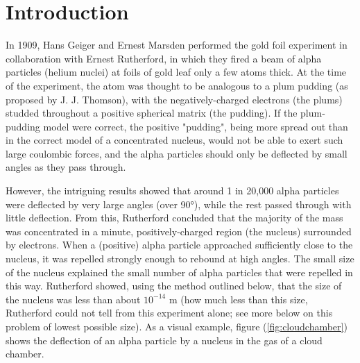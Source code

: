 \documentclass[%
 reprint,
nofootinbib,
 amsmath,amssymb,
 aps,
floatfix,
]{revtex4-2}
\begin{document}
\section{\label{sec:level1}Introduction}
    In 1909, Hans Geiger and Ernest Marsden performed the gold foil experiment in collaboration with Ernest Rutherford, in which they fired a beam of alpha particles (helium nuclei) at foils of gold leaf only a few atoms thick. At the time of the experiment, the atom was thought to be analogous to a plum pudding (as proposed by J. J. Thomson), with the negatively-charged electrons (the plums) studded throughout a positive spherical matrix (the pudding). If the plum-pudding model were correct, the positive "pudding", being more spread out than in the correct model of a concentrated nucleus, would not be able to exert such large coulombic forces, and the alpha particles should only be deflected by small angles as they pass through.
    \par
    However, the intriguing results showed that around 1 in 20,000 alpha particles were deflected by very large angles (over 90°), while the rest passed through with little deflection. From this, Rutherford concluded that the majority of the mass was concentrated in a minute, positively-charged region (the nucleus) surrounded by electrons. When a (positive) alpha particle approached sufficiently close to the nucleus, it was repelled strongly enough to rebound at high angles. The small size of the nucleus explained the small number of alpha particles that were repelled in this way. Rutherford showed, using the method outlined below, that the size of the nucleus was less than about $10^{-14}$ m (how much less than this size, Rutherford could not tell from this experiment alone; see more below on this problem of lowest possible size). As a visual example, figure (\ref{fig:cloudchamber}) shows the deflection of an alpha particle by a nucleus in the gas of a cloud chamber.
\end{document}

